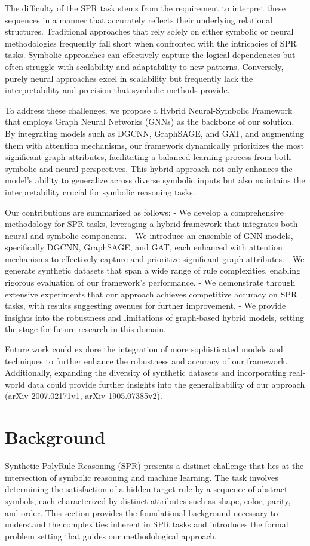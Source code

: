\documentclass{article}
\begin{document}
The difficulty of the SPR task stems from the requirement to interpret these sequences in a manner that accurately reflects their underlying relational structures. Traditional approaches that rely solely on either symbolic or neural methodologies frequently fall short when confronted with the intricacies of SPR tasks. Symbolic approaches can effectively capture the logical dependencies but often struggle with scalability and adaptability to new patterns. Conversely, purely neural approaches excel in scalability but frequently lack the interpretability and precision that symbolic methods provide.

To address these challenges, we propose a Hybrid Neural-Symbolic Framework that employs Graph Neural Networks (GNNs) as the backbone of our solution. By integrating models such as DGCNN, GraphSAGE, and GAT, and augmenting them with attention mechanisms, our framework dynamically prioritizes the most significant graph attributes, facilitating a balanced learning process from both symbolic and neural perspectives. This hybrid approach not only enhances the model's ability to generalize across diverse symbolic inputs but also maintains the interpretability crucial for symbolic reasoning tasks.

Our contributions are summarized as follows:
- We develop a comprehensive methodology for SPR tasks, leveraging a hybrid framework that integrates both neural and symbolic components.
- We introduce an ensemble of GNN models, specifically DGCNN, GraphSAGE, and GAT, each enhanced with attention mechanisms to effectively capture and prioritize significant graph attributes.
- We generate synthetic datasets that span a wide range of rule complexities, enabling rigorous evaluation of our framework's performance.
- We demonstrate through extensive experiments that our approach achieves competitive accuracy on SPR tasks, with results suggesting avenues for further improvement.
- We provide insights into the robustness and limitations of graph-based hybrid models, setting the stage for future research in this domain.

Future work could explore the integration of more sophisticated models and techniques to further enhance the robustness and accuracy of our framework. Additionally, expanding the diversity of synthetic datasets and incorporating real-world data could provide further insights into the generalizability of our approach (arXiv 2007.02171v1, arXiv 1905.07385v2).

\section{Background}
Synthetic PolyRule Reasoning (SPR) presents a distinct challenge that lies at the intersection of symbolic reasoning and machine learning. The task involves determining the satisfaction of a hidden target rule by a sequence of abstract symbols, each characterized by distinct attributes such as shape, color, parity, and order. This section provides the foundational background necessary to understand the complexities inherent in SPR tasks and introduces the formal problem setting that guides our methodological approach.
\end{document}
